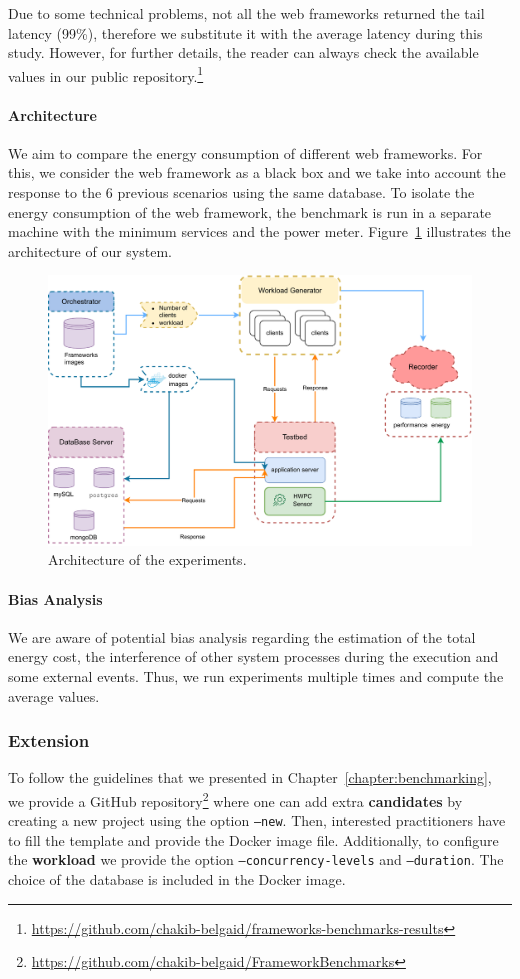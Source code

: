 Due to some technical problems, not all the web frameworks returned the tail latency (99\%), therefore we substitute it with the average latency during this study.
However, for further details, the reader can always check the available values in our public repository.\footnote{\url{https://github.com/chakib-belgaid/frameworks-benchmarks-results}}


\paragraph{Architecture}
We aim to compare the energy consumption of different web frameworks.
For this, we consider the web framework as a black box and we take into account the response to the 6 previous scenarios using the same database.
To isolate the energy consumption of the web framework, the benchmark is run in a separate machine with the minimum services and the power meter.
Figure~\ref{fig:architecture} illustrates the architecture of our system.

\begin{figure}[bht]
    \centering
    \includegraphics[width=.8\columnwidth]{imgs/architecture}
    \caption[Architecture]{Architecture of the experiments.}
    \label{fig:architecture}
\end{figure}


\paragraph{Bias Analysis}
We are aware of potential bias analysis regarding the estimation of the total energy cost, the interference of other system processes during the execution and some external events.
Thus, we run experiments multiple times and compute the average values.

\subsubsection{Extension}
To follow the guidelines that we presented in Chapter~\ref{chapter:benchmarking}, we provide a GitHub repository\footnote{\url{https://github.com/chakib-belgaid/FrameworkBenchmarks}} where one can add extra \textbf{candidates} by creating a new project using the option \texttt{--new}.
Then, interested practitioners have to fill the template and provide the Docker image file.
Additionally, to configure the \textbf{workload} we provide the option \texttt{--concurrency-levels} and \texttt{--duration}.
The choice of the database is included in the Docker image.

